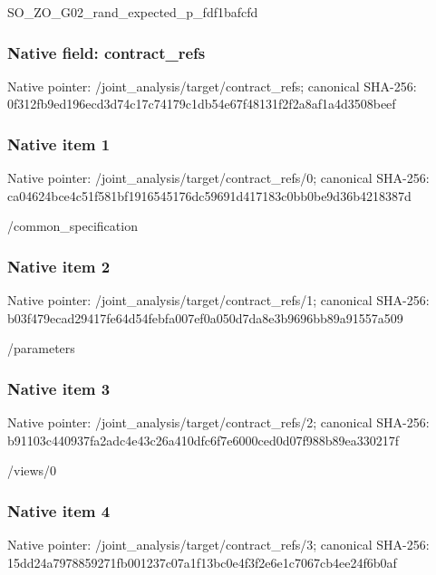 \documentclass[10pt,a4paper]{article}
\begin{document}
\begingroup\raggedright\sloppy SO\_\allowbreak{}ZO\_\allowbreak{}G02\_\allowbreak{}rand\_\allowbreak{}expected\_\allowbreak{}p\_\allowbreak{}fdf1bafcfd\par\endgroup

\subsubsection{Native field: contract\_\allowbreak{}refs}
Native pointer: /joint\_\allowbreak{}analysis/target/contract\_\allowbreak{}refs; canonical SHA-256: 0f312fb9ed196ecd3d74c17c74179c1db54e67f48131f2f2a8af1a4d3508beef

\subsubsection{Native item 1}
Native pointer: /joint\_\allowbreak{}analysis/target/contract\_\allowbreak{}refs/0; canonical SHA-256: ca04624bce4c51f581bf1916545176dc59691d417183c0bb0be9d36b4218387d

\begingroup\raggedright\sloppy /\allowbreak{}common\_\allowbreak{}specification\par\endgroup

\subsubsection{Native item 2}
Native pointer: /joint\_\allowbreak{}analysis/target/contract\_\allowbreak{}refs/1; canonical SHA-256: b03f479ecad29417fe64d54febfa007ef0a050d7da8e3b9696bb89a91557a509

\begingroup\raggedright\sloppy /\allowbreak{}parameters\par\endgroup

\subsubsection{Native item 3}
Native pointer: /joint\_\allowbreak{}analysis/target/contract\_\allowbreak{}refs/2; canonical SHA-256: b91103c440937fa2adc4e43c26a410dfc6f7e6000ced0d07f988b89ea330217f

\begingroup\raggedright\sloppy /\allowbreak{}views/\allowbreak{}0\par\endgroup

\subsubsection{Native item 4}
Native pointer: /joint\_\allowbreak{}analysis/target/contract\_\allowbreak{}refs/3; canonical SHA-256: 15dd24a7978859271fb001237c07a1f13bc0e4f3f2e6e1c7067cb4ee24f6b0af
\end{document}
